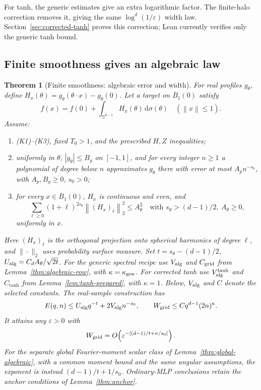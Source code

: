 \documentclass[11pt,letterpaper]{article}
\newcommand{\dd}{\,\mathrm d}
\newcommand{\eps}{\varepsilon}
\newcommand{\norm}[1]{\left\lVert#1\right\rVert}
\newcommand{\Sph}{\mathbb S^{d-1}}
\newcommand{\Ball}{\overline B_1(0)}
\newtheorem{theorem}{Theorem}
\theoremstyle{definition}
\theoremstyle{remark}
\begin{document}
For tanh, the generic estimates give an extra logarithmic factor.
The finite-halo correction removes it, giving the same \(\log^d(1/\eps)\)
width law. Section~\ref{sec:corrected-tanh} proves this correction;
Lean currently verifies only the generic tanh bound.

\subsection{Finite smoothness gives an algebraic law}
\begin{theorem}[Finite smoothness: algebraic error and width]\label{thm:multi-algebraic}
For real profiles \(g_\theta\), define
\(H_x(\theta)=g_\theta(\theta\cdot x)-g_\theta(0)\).
Let a target on \(\Ball\) satisfy
\[
 f(x)=f(0)+\int_{\Sph}H_x(\theta)\dd\sigma(\theta)
 \quad(\norm{x}\le1).
\]
Assume:
\begin{enumerate}
\item (K1)--(K3), fixed \(T_0>1\), and the prescribed \(H,Z\) inequalities;
\item uniformly in \(\theta\), \(|g_\theta|\le B_g\) on \([-1,1]\), and for
      every integer \(n\ge1\) a polynomial of degree below \(n\)
      approximates \(g_\theta\) there with error at most \(A_pn^{-s_0}\),
      with \(A_p,B_g\ge0\), \(s_0>0\);
\item for every \(x\in\Ball\), \(H_x\) is continuous and even, and
\[
 \sum_{\ell\ge0}(1+\ell)^{2s_\theta}
       \norm{(H_x)_\ell}_2^2\le A_\theta^2
 \quad\text{with }s_\theta>(d-1)/2,\ A_\theta\ge0,
\]
      uniformly in \(x\).
\end{enumerate}
Here \((H_x)_\ell\) is the orthogonal projection onto spherical harmonics
of degree \(\ell\), and \(\|\cdot\|_2\) uses probability surface measure.
Set \(t=s_\theta-(d-1)/2\), \(U_{\rm alg}=C_dA_\theta/\sqrt{2t}\).
For the generic spectral recipe use \(V_{\rm alg}\) and \(C_{\rm grid}\)
from Lemma~\ref{thm:algebraic-row}, with \(\kappa=\kappa_{\rm gen}\).
For corrected tanh use \(V_{\rm alg}^{\tanh}\) and \(C_{\tanh}\) from
Lemma~\ref{lem:tanh-prepared}, with \(\kappa=1\).
Below, \(V_{\rm alg}\) and \(C\) denote the selected constants.
The real-sample construction has
\[
 E(q,n)\le U_{\rm alg}q^{-t}+2V_{\rm alg}n^{-s_0},\qquad
 W_{\rm grid}\le Cq^{d-1}(2n)^\kappa .
\]
It attains any \(\eps>0\) with
\begin{equation}\label{eq:algebraic-width}
 W_{\rm grid}=O\!\left(
    \eps^{-[(d-1)/t+\kappa/s_0]}\right).
\end{equation}
For the separate global Fourier-moment scalar class of
Lemma~\ref{thm:global-algebraic}, with a common moment bound and the same
angular assumptions, the exponent is instead \((d-1)/t+1/s_0\).
Ordinary-MLP conclusions retain the anchor conditions of
Lemma~\ref{thm:anchor}.
\end{theorem}
\end{document}
